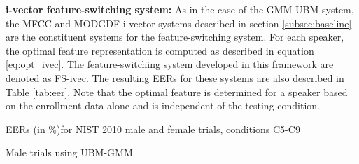 \documentclass[preprint,12pt,5p]{elsarticle}
\begin{document}
\textbf{i-vector feature-switching system:}
As in the case of the GMM-UBM system, the MFCC and MODGDF i-vector systems
described in section \ref{subsec:baseline} are the constituent systems for the
feature-switching system. For each speaker, the optimal feature representation
is computed as described in equation \ref{eq:opt_ivec}. The feature-switching 
system developed in this framework are denoted as FS-ivec. 
The resulting EERs for these systems are also described in Table \ref{tab:eer}.
Note that the optimal feature is determined for a speaker based on the enrollment data
alone and is independent of the testing condition.


\begin{table*}
\centering
\caption{EERs (in \%)for NIST 2010 male and female trials, conditions C5-C9 }

\begin{subtable}{.5\linewidth}
\centering
{
\caption{\small Male trials using UBM-GMM}
\label{tab:eer_ubm_male}}
\end{subtable}%
\begin{subtable}{.5\linewidth}
\centering
\caption{\small Female trials using UBM-GMM}
{
\label{tab:eer_ubm_female}}
\end{subtable}


\end{table*}
\end{document}
